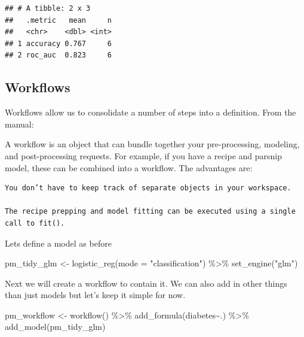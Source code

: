 \documentclass[
]{article}
\newenvironment{Shaded}{\begin{snugshade}}{\end{snugshade}}
\newcommand{\AttributeTok}[1]{\textcolor[rgb]{0.77,0.63,0.00}{#1}}
\newcommand{\FunctionTok}[1]{\textcolor[rgb]{0.00,0.00,0.00}{#1}}
\newcommand{\NormalTok}[1]{#1}
\newcommand{\OtherTok}[1]{\textcolor[rgb]{0.56,0.35,0.01}{#1}}
\newcommand{\SpecialCharTok}[1]{\textcolor[rgb]{0.00,0.00,0.00}{#1}}
\newcommand{\StringTok}[1]{\textcolor[rgb]{0.31,0.60,0.02}{#1}}
\begin{document}
\begin{verbatim}
## # A tibble: 2 x 3
##   .metric   mean     n
##   <chr>    <dbl> <int>
## 1 accuracy 0.767     6
## 2 roc_auc  0.823     6
\end{verbatim}

\hypertarget{workflows}{%
\subsection{Workflows}\label{workflows}}

Workflows allow us to consolidate a number of steps into a definition.
From the manual:

A workflow is an object that can bundle together your pre-processing,
modeling, and post-processing requests. For example, if you have a
recipe and parsnip model, these can be combined into a workflow. The
advantages are:

\begin{verbatim}
You don’t have to keep track of separate objects in your workspace.

The recipe prepping and model fitting can be executed using a single call to fit().
\end{verbatim}

Lets define a model as before

\begin{Shaded}
\begin{Highlighting}[]
\NormalTok{pm\_tidy\_glm }\OtherTok{\textless{}{-}} \FunctionTok{logistic\_reg}\NormalTok{(}\AttributeTok{mode =} \StringTok{"classification"}\NormalTok{) }\SpecialCharTok{\%\textgreater{}\%}
  \FunctionTok{set\_engine}\NormalTok{(}\StringTok{"glm"}\NormalTok{) }
\end{Highlighting}
\end{Shaded}

Next we will create a workflow to contain it. We can also add in other
things than just models but let's keep it simple for now.

\begin{Shaded}
\begin{Highlighting}[]
\NormalTok{pm\_workflow }\OtherTok{\textless{}{-}} \FunctionTok{workflow}\NormalTok{() }\SpecialCharTok{\%\textgreater{}\%}
  \FunctionTok{add\_formula}\NormalTok{(diabetes}\SpecialCharTok{\textasciitilde{}}\NormalTok{.) }\SpecialCharTok{\%\textgreater{}\%} 
  \FunctionTok{add\_model}\NormalTok{(pm\_tidy\_glm)}
\end{Highlighting}
\end{Shaded}
\end{document}
